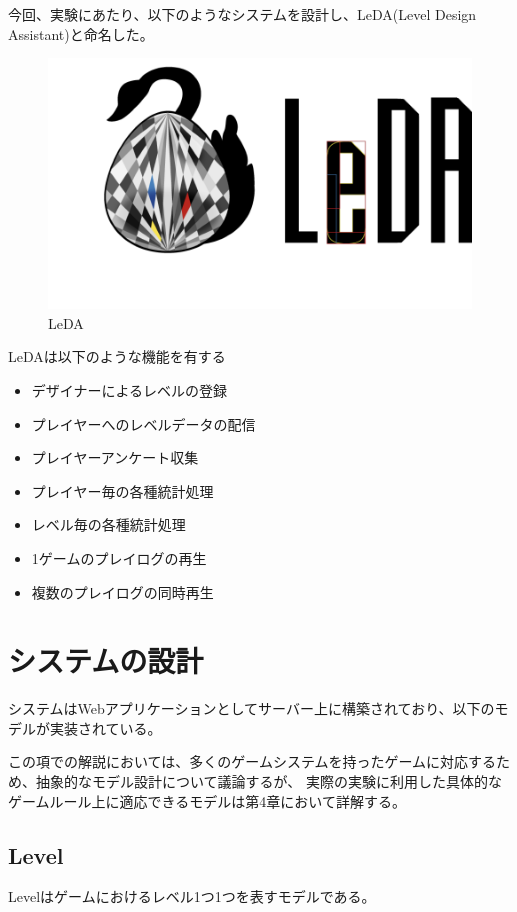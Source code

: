 今回、実験にあたり、以下のようなシステムを設計し、LeDA(Level Design Assistant)と命名した。

\begin{figure}[htbp]
  \begin{center}
    \includegraphics[bb=0 0 956 566, width=24cm]{images/logo.png}
  \end{center}
  \caption{LeDA}
  \label{fig:one}
\end{figure}

LeDAは以下のような機能を有する

\begin{itemize}
  \item デザイナーによるレベルの登録
  \item プレイヤーへのレベルデータの配信
  \item プレイヤーアンケート収集
  \item プレイヤー毎の各種統計処理
  \item レベル毎の各種統計処理
  \item 1ゲームのプレイログの再生
  \item 複数のプレイログの同時再生
\end{itemize}

\section{システムの設計}
システムはWebアプリケーションとしてサーバー上に構築されており、以下のモデルが実装されている。

この項での解説においては、多くのゲームシステムを持ったゲームに対応するため、抽象的なモデル設計について議論するが、
実際の実験に利用した具体的なゲームルール上に適応できるモデルは第4章において詳解する。

\subsection{Level}
Levelはゲームにおけるレベル1つ1つを表すモデルである。

